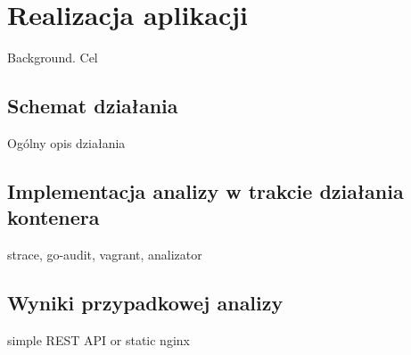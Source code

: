\chapter{Realizacja aplikacji}

Background. Cel

\section{Schemat działania}

Ogólny opis działania

\section{Implementacja analizy w trakcie działania kontenera}

strace, go-audit, vagrant, analizator

\section{Wyniki przypadkowej analizy}

simple REST API or static nginx
